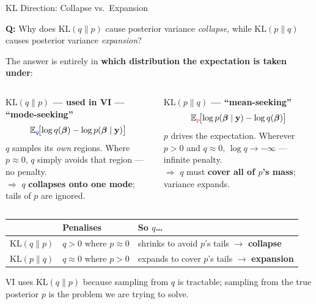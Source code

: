 \documentclass[aspectratio=169,12pt]{beamer}
\newcommand{\KL}{\mathrm{KL}}
\begin{document}
\begin{frame}{KL Direction: Collapse vs.\ Expansion}

\textbf{Q:} Why does $\KL(q\|p)$ cause posterior variance \emph{collapse},
while $\KL(p\|q)$ causes posterior variance \emph{expansion}?

\bigskip

The answer is entirely in \textbf{which distribution the expectation is taken under}:

\medskip
\begin{columns}[T]

\textbf{$\KL(q\|p)$ — used in VI — ``mode-seeking''}
\begin{equation*}
  \mathbb{E}_{\textcolor{blue}{q}}\!\bigl[\log q(\bm{\beta}) - \log p(\bm{\beta}\mid\mathbf{y})\bigr]
\end{equation*}
$q$ samples its \emph{own} regions.
Where $p\approx 0$, $q$ simply avoids that region — no penalty.\\[4pt]
$\Rightarrow$ $q$ \textbf{collapses onto one mode}; tails of $p$ are ignored.

\textbf{$\KL(p\|q)$ — ``mean-seeking''}
\begin{equation*}
  \mathbb{E}_{\textcolor{red}{p}}\!\bigl[\log p(\bm{\beta}\mid\mathbf{y}) - \log q(\bm{\beta})\bigr]
\end{equation*}
$p$ drives the expectation.
Wherever $p>0$ and $q\approx 0$, $\log q\to-\infty$ — infinite penalty.\\[4pt]
$\Rightarrow$ $q$ must \textbf{cover all of $p$'s mass}; variance expands.

\end{columns}

\bigskip
\begin{center}
\renewcommand{\arraystretch}{1.3}
\begin{tabular}{@{}lll@{}}
\toprule
& \textbf{Penalises} & \textbf{So $q$\ldots} \\
\midrule
$\KL(q\|p)$ & $q>0$ where $p\approx 0$ & shrinks to avoid $p$'s tails $\to$ \textbf{collapse} \\
$\KL(p\|q)$ & $q\approx 0$ where $p>0$ & expands to cover $p$'s tails $\to$ \textbf{expansion} \\
\bottomrule
\end{tabular}
\end{center}

\smallskip
{\small VI uses $\KL(q\|p)$ because sampling from $q$ is tractable;
sampling from the true posterior $p$ is the problem we are trying to solve.}

\end{frame}
\end{document}
